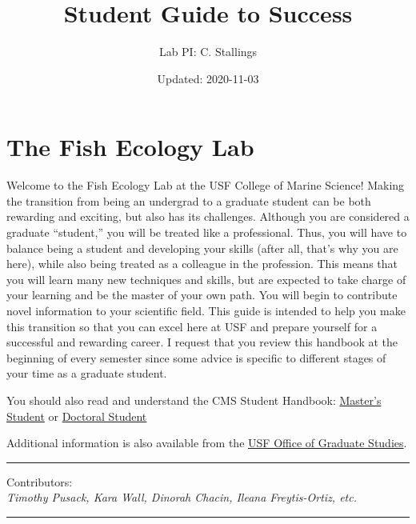 \documentclass[
]{article}
\title{Student Guide to Success}
\author{Lab PI: C. Stallings}
\date{Updated: 2020-11-03}
\begin{document}
\maketitle

{
\hypersetup{linkcolor=}
\setcounter{tocdepth}{2}
\tableofcontents
}
\hypertarget{the-fish-ecology-lab}{%
\section*{\texorpdfstring{\textbf{The Fish Ecology Lab}}{The Fish Ecology Lab}}\label{the-fish-ecology-lab}}

Welcome to the Fish Ecology Lab at the USF College of Marine Science! Making the transition from being an undergrad to a graduate student can be both rewarding and exciting, but also has its challenges. Although you are considered a graduate ``student,'' you will be treated like a professional. Thus, you will have to balance being a student and developing your skills (after all, that's why you are here), while also being treated as a colleague in the profession. This means that you will learn many new techniques and skills, but are expected to take charge of your learning and be the master of your own path. You will begin to contribute novel information to your scientific field. This guide is intended to help you make this transition so that you can excel here at USF and prepare yourself for a successful and rewarding career. I request that you review this handbook at the beginning of every semester since some advice is specific to different stages of your time as a graduate student.

You should also read and understand the CMS Student Handbook: \href{https://usf.app.box.com/s/2ew6pwdre3jkexgv8fgdwo8ticnvr7cc}{Master's Student} or \href{https://usf.app.box.com/s/mapv44nebi90iz7y9rjprsekcwps1yua}{Doctoral Student}

Additional information is also available from the \href{https://www.usf.edu/graduate-studies/}{USF Office of Graduate Studies}.

\begin{center}\rule{0.5\linewidth}{0.5pt}\end{center}

Contributors:\\
\emph{Timothy Pusack, Kara Wall, Dinorah Chacin, Ileana Freytis-Ortiz, etc.}

\begin{center}\rule{0.5\linewidth}{0.5pt}\end{center}
\end{document}
